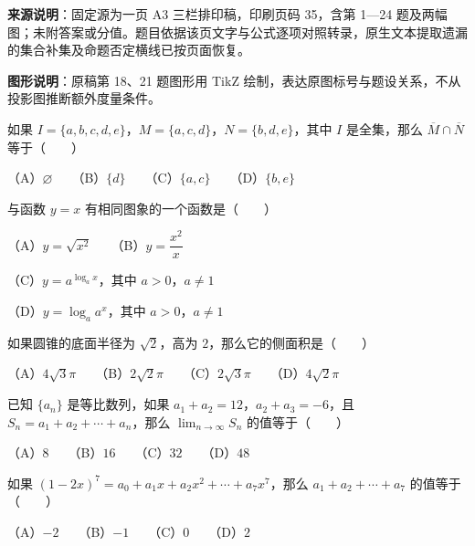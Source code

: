 


\begin{gktip}
\textbf{来源说明}：固定源为一页 A3 三栏排印稿，印刷页码 35，含第 1—24 题及两幅图；未附答案或分值。题目依据该页文字与公式逐项对照转录，原生文本提取遗漏的集合补集及命题否定横线已按页面恢复。

\textbf{图形说明}：原稿第 18、21 题图形用 TikZ 绘制，表达原图标号与题设关系，不从投影图推断额外度量条件。
\end{gktip}

\begin{question}

如果 $I=\{a,b,c,d,e\}$，$M=\{a,c,d\}$，$N=\{b,d,e\}$，其中 $I$ 是全集，那么 $\overline M\cap\overline N$ 等于\mbox{（　　）}

（A）$\varnothing$　　（B）$\{d\}$　　（C）$\{a,c\}$　　（D）$\{b,e\}$

\end{question}
\begin{question}

与函数 $y=x$ 有相同图象的一个函数是\mbox{（　　）}

（A）$y=\sqrt{x^2}$　　（B）$y=\dfrac{x^2}{x}$

（C）$y=a^{\log_a x}$，其中 $a>0$，$a\ne1$

（D）$y=\log_a a^x$，其中 $a>0$，$a\ne1$

\end{question}
\begin{question}

如果圆锥的底面半径为 $\sqrt2$，高为 $2$，那么它的侧面积是\mbox{（　　）}

（A）$4\sqrt3\pi$　　（B）$2\sqrt2\pi$　　（C）$2\sqrt3\pi$　　（D）$4\sqrt2\pi$

\end{question}
\begin{question}

已知 $\{a_n\}$ 是等比数列，如果 $a_1+a_2=12$，$a_2+a_3=-6$，且 $S_n=a_1+a_2+\cdots+a_n$，那么 $\displaystyle\lim_{n\to\infty}S_n$ 的值等于\mbox{（　　）}

（A）$8$　　（B）$16$　　（C）$32$　　（D）$48$

\end{question}
\begin{question}

如果 $(1-2x)^7=a_0+a_1x+a_2x^2+\cdots+a_7x^7$，那么 $a_1+a_2+\cdots+a_7$ 的值等于\mbox{（　　）}

（A）$-2$　　（B）$-1$　　（C）$0$　　（D）$2$

\end{question}
